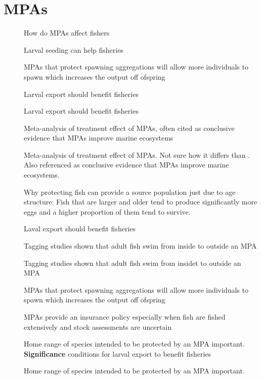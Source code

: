 \documentclass[]{article}
\author{}
\date{}
\begin{document}
\section{MPAs}

\begin{description}
\item[\citet{Dawetal2010}]
How do MPAs affect fishers
\item[\citet{Hilbornetal2004}]
Larval seeding can help fisheries

MPAs that protect spawning aggregations will allow more individuals to
spawn which increases the output off ofspring
\item[\citet{Gainesetal2010}]
Larval export should benefit fisheries
\item[\citet{Gainesetal2010a}]
Larval export should benefit fisheries
\item[\citet{Halpern2003}]
Meta-analysis of treatment effect of MPAs, often cited as conclusive
evidence that MPAs improve marine ecosystems
\item[\citet{Lesteretal2009}]
Meta-analysis of treatment effect of MPAs. Not sure how it differs than
\citet{Halpern2003}. Also referenced as conclusive evidence that MPAs
improve marine ecosystems.
\item[\citet{Francisetal2007}]
Why protecting fish can provide a source population just due to age
structure: Fish that are larger and older tend to produce significantly
more eggs and a higher proportion of them tend to survive.
\item[\citet{HofmannGaines2008}]
Laval export should benefit fisheries
\item[\citet{McClanahanKaundaArara1996}]
Tagging studies shown that adult fish swim from inside to outside an MPA
\item[\citet{Loweetal2003}]
Tagging studies shown that adult fish swim from insidet to outside an
MPA
\item[\citet{Murawskietal2000}]
MPAs that protect spawning aggregations will allow more individuals to
spawn which increases the output off ofspring
\item[\citet{NationalResearchCouncil2001}]
MPAs provide an insurance policy especially when fish are fished
extensively and stock assessments are uncertain
\item[\citet{Loweetal2003}]
Home range of species intended to be protected by an MPA important.
\textbf{Significance} conditions for larval export to benefit fisheries
\item[\citet{Grussetal2011}]
Home range of species intended to be protected by an MPA important.


\end{description}
\end{document}
